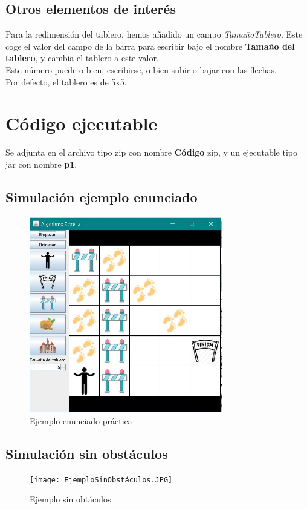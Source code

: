 \documentclass[12pt]{article}
\begin{document}
\subsection{Otros elementos de interés}
Para la redimensión del tablero, hemos añadido un campo \textit{TamañoTablero}. Este coge el valor del campo de la barra para escribir bajo el nombre \textbf{Tamaño del tablero}, y cambia el tablero a este valor.\\ Este número puede o bien, escribirse, o bien subir o bajar con las flechas.\\
Por defecto, el tablero es de 5x5.

\section{Código ejecutable}
Se adjunta en el archivo tipo zip con nombre \textbf{Código} zip, y un ejecutable tipo jar con nombre \textbf{p1}.
\subsection{Simulación ejemplo enunciado}
\begin{figure}[H]
    \centering
    \includegraphics[width=0.75\textwidth]{EjemploEnunciado.JPG}
    \caption{Ejemplo enunciado práctica}
\end{figure}
\subsection{Simulación sin obstáculos}
\begin{figure}[H]
    \centering
    \texttt{[image: EjemploSinObstáculos.JPG]}
    \caption{Ejemplo sin obtáculos}
\end{figure}
\end{document}
